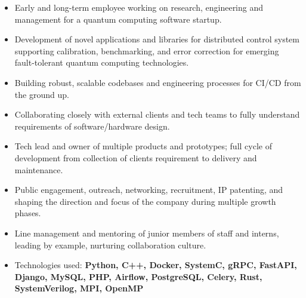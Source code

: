 \documentclass[10pt,a4paper,ragged2e,withhyper]{altacv}
\begin{document}
\begin{paracol}{2}
\begin{itemize}
    
    \item Early and long-term employee working on research, engineering and
    management for a quantum computing software startup.

    \item Development of novel applications and libraries for
    distributed control system supporting calibration, benchmarking,
    and error correction for emerging fault-tolerant quantum computing
    technologies.

    \item Building robust, scalable codebases and engineering processes for
    CI/CD from the ground up.

    \item Collaborating closely with external clients and tech teams to fully
    understand requirements of software/hardware design.

    \item Tech lead and owner of multiple products and prototypes;
    full cycle of development from collection of clients requirement to
    delivery and maintenance.

    \item Public engagement, outreach, networking, recruitment, IP patenting,
    and shaping the direction and focus of the company during multiple growth
    phases.

    \item Line management and mentoring of junior members of staff and interns,
    leading by example, nurturing collaboration culture.

    \item
    Technologies used:
    {\bf
    Python, C++, Docker, SystemC,
    gRPC,
    FastAPI, 
    Django, MySQL, PHP,
    Airflow, PostgreSQL, Celery,
    Rust,
    SystemVerilog,
    MPI, OpenMP
    }

\end{itemize}

\divider

 


\end{paracol}
\end{document}
